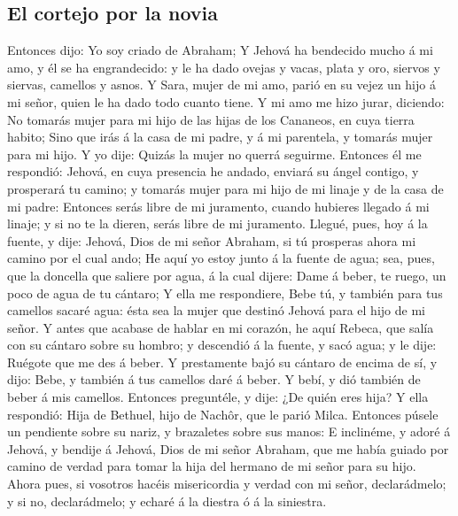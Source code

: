 \hypertarget{el-cortejo-por-la-novia}{%
\subsection{El cortejo por la novia}\label{el-cortejo-por-la-novia}}

 Entonces dijo: Yo soy criado de Abraham; 
Y Jehová ha bendecido mucho á mi amo, y él se ha engrandecido: y le ha
dado ovejas y vacas, plata y oro, siervos y siervas, camellos y asnos.
 Y Sara, mujer de mi amo, parió en su vejez un hijo á mi
señor, quien le ha dado todo cuanto tiene.  Y mi amo me
hizo jurar, diciendo: No tomarás mujer para mi hijo de las hijas de los
Cananeos, en cuya tierra habito;  Sino que irás á la casa
de mi padre, y á mi parentela, y tomarás mujer para mi hijo.
 Y yo dije: Quizás la mujer no querrá seguirme.
 Entonces él me respondió: Jehová, en cuya presencia he
andado, enviará su ángel contigo, y prosperará tu camino; y tomarás
mujer para mi hijo de mi linaje y de la casa de mi padre:
 Entonces serás libre de mi juramento, cuando hubieres
llegado á mi linaje; y si no te la dieren, serás libre de mi juramento.
 Llegué, pues, hoy á la fuente, y dije: Jehová, Dios de
mi señor Abraham, si tú prosperas ahora mi camino por el cual ando;
 He aquí yo estoy junto á la fuente de agua; sea, pues,
que la doncella que saliere por agua, á la cual dijere: Dame á beber, te
ruego, un poco de agua de tu cántaro;  Y ella me
respondiere, Bebe tú, y también para tus camellos sacaré agua: ésta sea
la mujer que destinó Jehová para el hijo de mi señor.  Y
antes que acabase de hablar en mi corazón, he aquí Rebeca, que salía con
su cántaro sobre su hombro; y descendió á la fuente, y sacó agua; y le
dije: Ruégote que me des á beber.  Y prestamente bajó su
cántaro de encima de sí, y dijo: Bebe, y también á tus camellos daré á
beber. Y bebí, y dió también de beber á mis camellos. 
Entonces preguntéle, y dije: ¿De quién eres hija? Y ella respondió: Hija
de Bethuel, hijo de Nachôr, que le parió Milca. Entonces púsele un
pendiente sobre su nariz, y brazaletes sobre sus manos: 
E inclinéme, y adoré á Jehová, y bendije á Jehová, Dios de mi señor
Abraham, que me había guiado por camino de verdad para tomar la hija del
hermano de mi señor para su hijo.  Ahora pues, si
vosotros hacéis misericordia y verdad con mi señor, declarádmelo; y si
no, declarádmelo; y echaré á la diestra ó á la siniestra.

